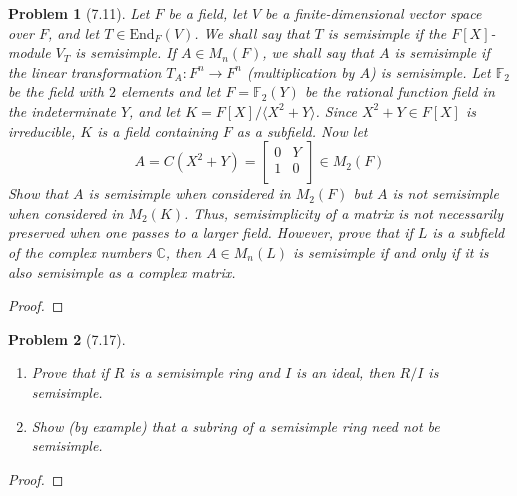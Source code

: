 \documentclass[10pt]{article}
\newcommand{\sk}{\vskip 10mm}
\newcommand{\bb}[1]{\mathbb{#1}}
\theoremstyle{plain}
\newtheorem{problem}{Problem}
\theoremstyle{remark}
\begin{document}
\begin{problem}[7.11]
  Let $F$ be a field, let $V$ be a finite-dimensional vector space over $F$,
  and let $T\in \text{End}_F(V)$. We shall say that $T$ is semisimple if the
  $F[X]$-module $V_T$ is semisimple. If $A\in M_n(F)$, we shall say that $A$
  is semisimple if the linear transformation $T_A: F^n\rightarrow F^n$
  (multiplication by $A$) is semisimple. Let $\bb{F}_2$ be the field with
  $2$ elements and let $F=\bb{F}_2(Y)$ be the rational function field in
  the indeterminate $Y$, and let $K=F[X]/\langle X^2+Y\rangle$. Since
  $X^2+Y\in F[X]$ is irreducible, $K$ is a field containing
  $F$ as a subfield. Now let
  \[
    A=C(X^2+Y)=
    \left[
      \begin{array}{cc}
        0&Y\\
        1&0\\
      \end{array}
    \right]
    \in M_2(F)
  \]
  Show that $A$ is semisimple when considered in $M_2(F)$ but $A$ is not
  semisimple when considered in $M_2(K)$. Thus, semisimplicity of a matrix
  is not necessarily preserved when one passes to a larger field. However,
  prove that if $L$ is a subfield of the complex numbers $\bb{C}$, then
  $A\in M_n(L)$ is semisimple if and only if it is also semisimple as a complex
  matrix.
\end{problem}

\begin{proof}
  
\end{proof}

\sk

\begin{problem}[7.17]
  \begin{enumerate}
  \item[(a)] Prove that if $R$ is a semisimple ring and $I$ is an ideal,
    then $R/I$ is semisimple.
  \item[(b)] Show (by example) that a subring of a semisimple ring need
    not be semisimple.
  \end{enumerate}
\end{problem}

\begin{proof}
  
\end{proof}

\end{document}
